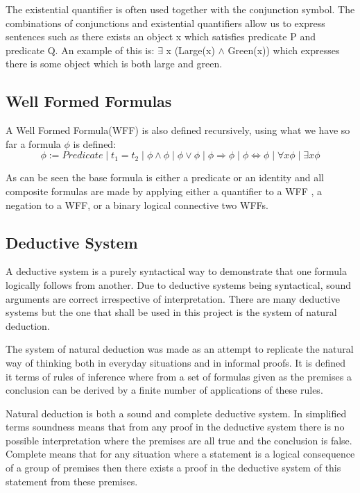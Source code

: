 {The existential quantifier is often used together with the conjunction symbol. The combinations of conjunctions and existential quantifiers allow us to express sentences such as there exists an object x which satisfies predicate P and predicate Q. An example of this is: $\exists$ x (Large(x) $\land $ Green(x)) which expresses there is some object which is both large and green.

\subsection*{Well Formed Formulas}

A Well Formed Formula(WFF) is also defined recursively, using what we have so far a formula $\phi$ is defined: 
$$ \phi := Predicate \mid t_1 = t_2 \mid \phi \land \phi \mid \phi \lor \phi \mid \phi \Rightarrow \phi \mid \phi \Leftrightarrow \phi \mid \forall x \phi \mid \exists x \phi$$

As can be seen the base formula is either a predicate or an identity and all composite formulas are made by applying either a quantifier to a WFF , a negation to a WFF, or a binary logical connective two WFFs.

\subsection{Deductive System}

A deductive system is a purely syntactical way to demonstrate that one formula logically follows from another. Due to deductive systems being syntactical, sound arguments are correct irrespective of interpretation. There are many deductive systems but the one that shall be used in this project is the system of natural deduction.

The system of natural deduction was made as an attempt to replicate the natural way of thinking both in everyday situations and in informal proofs. It is defined it terms of rules of inference where from a set of formulas given as the premises a conclusion can be derived by a finite number of applications of these rules.

Natural deduction is both a sound and complete deductive system. In simplified terms soundness means that from any proof in the deductive system there is no possible interpretation where the premises are all true and the conclusion is false. Complete means that for any situation where a statement is a logical consequence of a group of premises then there exists a proof in the deductive system of this statement from these premises.


}
